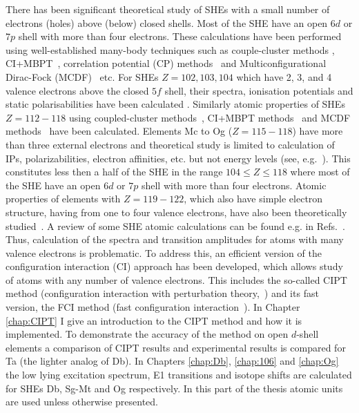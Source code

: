 \documentclass[10pt,a4paper, twoside, openright]{report}
\begin{document}
There has been significant theoretical study of SHEs with a small number of electrons (holes) above (below) closed shells. Most of the SHE have an open $6d$ or $7p$ shell with more than four electrons. These calculations have been performed using well-established many-body techniques such  as couple-cluster methods \cite{Lindgren1986,Blundell1991}, CI+MBPT~\cite{Dzuba1996}, correlation potential (CP) methods~\cite{Dzuba1989} and Multiconfigurational Dirac-Fock (MCDF)~\cite{Grant1988, Fischer2016} etc.  For SHEs $Z=102,103,104$ which have 2, 3, and 4 valence electrons above the  closed $5f$ shell, their spectra, ionisation potentials and static polarisabilities have been calculated \cite{Liu2007,Desclaux1980,Eliav1995,Fritzsche2007,Zou2002, Borschevsky2007,Martin1996,Mosyagin2010, DSS2014, Eliav2015, Kaldor2007, E114b, Dzuba2016}. Similarly atomic properties of SHEs  $Z=112-118$ using  coupled-cluster methods~\cite{pershina2015, DF2016, Eliav2015, Pershina2008, Nash2005,Landau2001,Borschevsky2015, Thierfelder2008,Kaldor2008,Dinh2016,Indelicato2007}, CI+MBPT methods~\cite{Dinh2008, Dzuba1996} and MCDF methods~\cite{Eliav1996, Yu2008} have been calculated.  Elements Mc to Og ($Z=115-118$) have more than three external electrons and theoretical study is limited to calculation of IPs, polarizabilities, electron affinities, etc. but not energy levels (see, e.g.~\cite{Borschevsky2015}). This constitutes less then a half of the SHE in the range $104 \leq Z \leq 118$ where most of the SHE have an open $6d$ or $7p$ shell with more than four electrons. Atomic properties of elements with $Z=119-122$, which also have simple electron structure, having from one to four valence electrons,  have also been theoretically studied~\cite{Landau2001a, Lim2005, Dinh120_2008, DDG2008, Gaigalas2010, Borschevsky2013, Skripnikov2013, Dzuba2013, Ginges2015, Eliav2015}. A review of some SHE atomic calculations can be found  e.g. in Refs.~\cite{Eliav2015,Schwerdtfeger2014, Pershina2009, Pershina2014}.\\
\linebreak
Thus, calculation of the spectra and transition amplitudes for atoms with many valence electrons is problematic. To address this, an efficient version of the configuration interaction (CI) approach has been developed, which allows study of atoms with any number of valence electrons. This includes the so-called CIPT method (configuration interaction with perturbation theory,~\cite{DBHF2017}) and its fast version, the FCI method (fast configuration interaction~\cite{FCI}). In Chapter \ref{chap:CIPT} I give an introduction to the CIPT method and how it is implemented. To demonstrate the accuracy of the method on open $d$-shell elements a comparison of CIPT results and experimental results is compared for Ta (the lighter analog of Db). In Chapters \ref{chap:Db}, \ref{chap:106} and \ref{chap:Og} the low lying excitation spectrum, E1 transitions and isotope shifts are calculated for SHEs Db, Sg-Mt and Og respectively.  In this part of the thesis atomic units are used unless otherwise presented.
\end{document}
